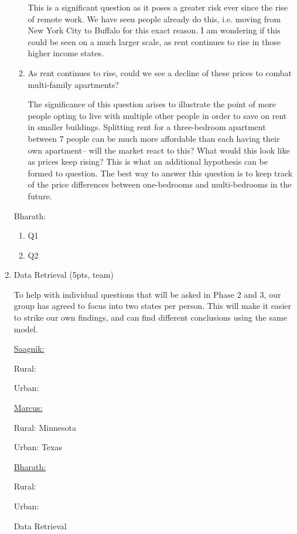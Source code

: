 \documentclass[a4paper]{article}
\begin{document}
\begin{enumerate}
\begin{enumerate}
    \bigbreak
    This is a significant question as it poses a greater risk ever since the rise of remote work. We have seen people already do this, i.e. moving from New York City to Buffalo for this exact reason. I am wondering if this could be seen on a much larger scale, as rent continues to rise in those higher income states.

    \item As rent continues to rise, could we see a decline of these prices to combat multi-family apartments?
    
    The significance of this question arises to illustrate the point of more people opting to live with multiple other people in order to save on rent in smaller buildings. Splitting rent for a three-bedroom apartment between 7 people can be much more affordable than each having their own apartment-- will the market react to this? What would this look like as prices keep rising? This is what an additional hypothesis can be formed to question. The best way to answer this question is to keep track of the price differences between one-bedrooms and multi-bedrooms in the future.
  \end{enumerate}

  Bharath:

  \begin{enumerate}
    \item Q1
    \item Q2
  \end{enumerate}

  \item Data Retrieval (5pts, team)
  
  To help with individual questions that will be asked in Phase 2 and 3, our group has agreed to focus into two states per person. This will make it easier to strike our own findings, and can find different conclusions using the same model.

  \underline{Saagnik:}

  Rural:

  Urban:

  \underline{Marcus:}

  Rural: Minnesota

  Urban: Texas

  \underline{Bharath:}

  Rural:

  Urban:

  \bigbreak
  \begin{center}
    Data Retrieval
  \end{center}


\end{enumerate}
\end{document}
